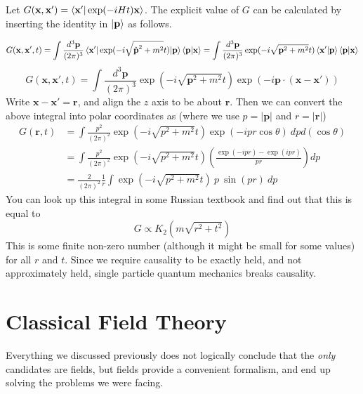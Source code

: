 \documentclass[11pt, notitlepage]{report}
\numberwithin{equation}{section}
\begin{document}
    Let \(G(\textbf{x},\textbf{x}') = \braket{\textbf{x}' | \exp(-iHt) \textbf{x}}\). The explicit value of \(G\) can be calculated by inserting the identity in \(\ket{\textbf{p}}\) as follows.

    \begin{equation}
        G(\textbf{x}, \textbf{x}', t) = \int \frac{d^3\textbf{p}}{(2\pi)^3} \braket{\textbf{x}' | \exp(-i\sqrt{\hat{\textbf{p}}^2 + m^2} t) | \textbf{p}} \braket{\textbf{p}|\textbf{x}} = \int \frac{d^3\textbf{p}}{(2\pi)^3} \exp(-i\sqrt{\textbf{p}^2 + m^2} t)\braket{\textbf{x}'| \textbf{p}} \braket{\textbf{p}|\textbf{x}}
    \end{equation}
    \begin{equation}
        G(\textbf{x},\textbf{x}', t) = \int \frac{d^3\textbf{p}}{(2\pi)^3}  \exp(-i\sqrt{\textbf{p}^2 + m^2} t) \exp(-i \textbf{p}\cdot(\textbf{x}-\textbf{x}'))
    \end{equation}
    Write \(\textbf{x} - \textbf{x}' = \textbf{r}\), and align the \(z\) axis to be about \(\textbf{r}\). Then we can convert the above integral into polar coordinates as (where we use \(p = |\textbf{p}|\) and \(r = |\textbf{r}|\))
    \begin{align}
        G(\textbf{r}, t) &= \int \frac{p^2}{(2\pi)^2} \exp(-i\sqrt{p^2 + m^2} t) \exp(-i p r \cos\theta)~ dp d(\cos\theta)\\
        &= \int \frac{p^2}{(2\pi)^2} \exp(-i\sqrt{p^2 + m^2} t) \left( \frac{\exp(-ipr) - \exp(ipr)}{pr} \right)dp\\
        &= \frac{2}{(2\pi)^2}\frac{1}{r}\int \exp(-i\sqrt{p^2 + m^2} t)~ p ~\sin(pr)~dp
    \end{align}
    You can look up this integral in some Russian textbook and find out that this is equal to 
    \begin{equation}
        G \propto K_2 (m\sqrt{r^2 + t^2}) 
    \end{equation}
    This is some finite non-zero number (although it might be small for some values) for all \(r\) and \(t\). Since we require causality to be exactly held, and not approximately held, single particle quantum mechanics breaks causality.

    \newpage
    \section{Classical Field Theory}
    Everything we discussed previously does not logically conclude that the \textit{only} candidates are fields, but fields provide a convenient formalism, and end up solving the problems we were facing. \\
\end{document}
